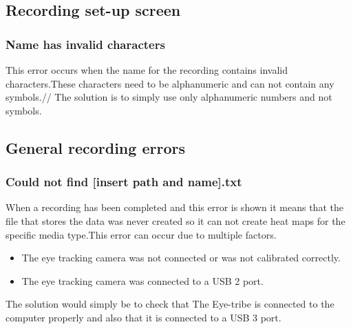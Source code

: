 \subsection{Recording set-up screen}
\subsubsection{Name has invalid characters}
This error occurs when the name for the recording contains invalid characters.These characters need to be alphanumeric and can not contain any symbols.//
The solution is to simply use only alphanumeric numbers and not symbols.
\subsection{General recording errors}
\subsubsection{Could not find [insert path and name].txt}
When a recording has been completed and this error is shown it means that the file that stores the data was never created so it can not create heat maps for the specific media type.This error can occur due to multiple factors.\\
\begin{itemize}
\item The eye tracking camera was not connected or was not calibrated correctly.
\item The eye tracking camera was connected to a USB 2 port.
\end{itemize}
The solution would simply be to check that The Eye-tribe is connected to the computer properly and also that it is connected to a USB 3 port.
